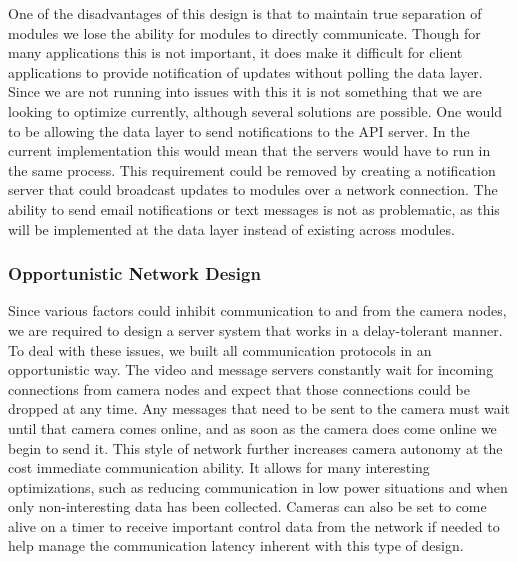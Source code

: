 One of the disadvantages of this design is that to maintain true separation of
modules we lose the ability for modules to directly communicate.  Though for
many applications this is not important, it does make it difficult for client
applications to provide notification of updates without polling the data layer.
Since we are not running into issues with this it is not something that we are
looking to optimize currently, although several solutions are possible. One
would to be allowing the data layer to send notifications to the API server.  In
the current implementation this would mean that the servers would have to run in
the same process. This requirement could be removed by creating a notification
server that could broadcast updates to modules over a network connection. The
ability to send email notifications or text messages is not as problematic, as
this will be implemented at the data layer instead of existing across modules.




\subsubsection{Opportunistic Network Design}

Since various factors could inhibit communication to and from the camera nodes,
we are required to design a server system that works in a delay-tolerant manner.
To deal with these issues, we built all communication protocols in an
opportunistic way. The video and message servers constantly wait for incoming
connections from camera nodes and expect that those connections could be dropped
at any time. Any messages that need to be sent to the camera must wait until
that camera comes online, and as soon as the camera does come online we begin to
send it. This style of network further increases camera autonomy at the cost
immediate communication ability. It allows for many interesting optimizations,
such as reducing communication in low power situations and when only
non-interesting data has been collected. Cameras can also be set to come alive
on a timer to receive important control data from the network if needed to help
manage the communication latency inherent with this type of design.

